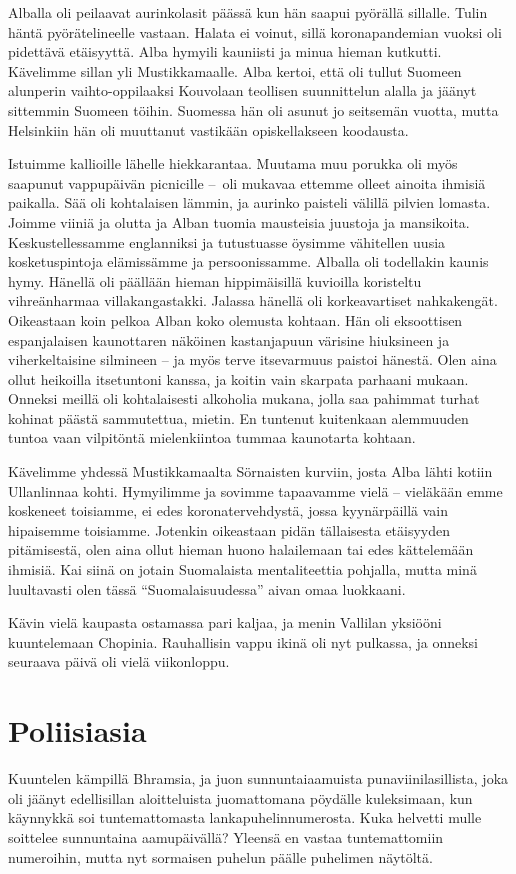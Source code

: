 \documentclass{tsnovel}
\begin{document}
Alballa oli peilaavat aurinkolasit päässä kun hän saapui pyörällä sillalle. Tulin häntä pyörätelineelle vastaan. Halata ei voinut, sillä koronapandemian vuoksi oli pidettävä etäisyyttä. Alba hymyili kauniisti ja minua hieman kutkutti. Kävelimme sillan yli Mustikkamaalle. Alba kertoi, että oli tullut Suomeen alunperin vaihto-oppilaaksi Kouvolaan teollisen suunnittelun alalla ja jäänyt sittemmin Suomeen töihin. Suomessa hän oli asunut jo seitsemän vuotta, mutta Helsinkiin hän oli muuttanut vastikään opiskellakseen koodausta.

Istuimme kallioille lähelle hiekkarantaa. Muutama muu porukka oli myös saapunut vappupäivän picnicille – oli mukavaa ettemme olleet ainoita ihmisiä paikalla. Sää oli kohtalaisen lämmin, ja aurinko paisteli välillä pilvien lomasta. Joimme viiniä ja olutta ja Alban tuomia mausteisia juustoja ja mansikoita. Keskustellessamme englanniksi ja tutustuasse öysimme vähitellen uusia kosketuspintoja elämissämme ja persoonissamme. Alballa oli todellakin kaunis hymy. Hänellä oli päällään hieman hippimäisillä kuvioilla koristeltu vihreänharmaa villakangastakki. Jalassa hänellä oli korkeavartiset nahkakengät. Oikeastaan koin  pelkoa Alban koko olemusta kohtaan. Hän oli eksoottisen espanjalaisen kaunottaren näköinen kastanjapuun värisine hiuksineen ja viherkeltaisine silmineen – ja myös terve itsevarmuus paistoi hänestä. Olen aina ollut heikoilla itsetuntoni kanssa, ja koitin vain skarpata parhaani mukaan. Onneksi meillä oli kohtalaisesti alkoholia mukana, jolla saa pahimmat turhat kohinat päästä sammutettua, mietin. En tuntenut kuitenkaan alemmuuden tuntoa vaan vilpitöntä mielenkiintoa tummaa kaunotarta kohtaan.

Kävelimme yhdessä Mustikkamaalta Sörnaisten kurviin, josta Alba lähti kotiin Ullanlinnaa kohti. Hymyilimme ja sovimme tapaavamme vielä – vieläkään emme koskeneet toisiamme, ei edes koronatervehdystä, jossa kyynärpäillä vain hipaisemme toisiamme. Jotenkin oikeastaan pidän tällaisesta etäisyyden pitämisestä, olen aina ollut hieman huono halailemaan tai edes kättelemään ihmisiä. Kai siinä on jotain Suomalaista mentaliteettia pohjalla, mutta minä luultavasti olen tässä ``Suomalaisuudessa'' aivan omaa luokkaani.

Kävin vielä kaupasta ostamassa pari kaljaa, ja menin Vallilan yksiööni kuuntelemaan Chopinia. Rauhallisin vappu ikinä oli nyt pulkassa, ja onneksi seuraava päivä oli vielä viikonloppu.


\section{Poliisiasia}
Kuuntelen kämpillä Bhramsia, ja juon sunnuntaiaamuista punaviinilasillista, joka oli jäänyt edellisillan aloitteluista juomattomana pöydälle kuleksimaan, kun käynnykkä soi tuntemattomasta lankapuhelinnumerosta. Kuka helvetti mulle soittelee sunnuntaina aamupäivällä? Yleensä en vastaa tuntemattomiin numeroihin, mutta nyt sormaisen puhelun päälle puhelimen näytöltä.
\end{document}
